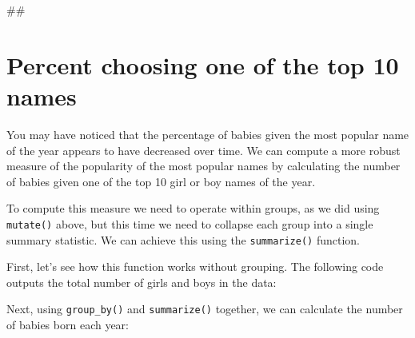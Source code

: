 \documentclass[]{book}
\newenvironment{Shaded}{\begin{snugshade}}{\end{snugshade}}
\newcommand{\KeywordTok}[1]{\textcolor[rgb]{0.13,0.29,0.53}{\textbf{#1}}}
\newcommand{\DataTypeTok}[1]{\textcolor[rgb]{0.13,0.29,0.53}{#1}}
\newcommand{\StringTok}[1]{\textcolor[rgb]{0.31,0.60,0.02}{#1}}
\newcommand{\OperatorTok}[1]{\textcolor[rgb]{0.81,0.36,0.00}{\textbf{#1}}}
\newcommand{\NormalTok}[1]{#1}
\begin{document}
\begin{Shaded}
\begin{Highlighting}[]
\NormalTok{##}
\end{Highlighting}
\end{Shaded}

\section{Percent choosing one of the top 10
names}\label{percent-choosing-one-of-the-top-10-names}

You may have noticed that the percentage of babies given the most
popular name of the year appears to have decreased over time. We can
compute a more robust measure of the popularity of the most popular
names by calculating the number of babies given one of the top 10 girl
or boy names of the year.

To compute this measure we need to operate within groups, as we did
using \texttt{mutate()} above, but this time we need to collapse each
group into a single summary statistic. We can achieve this using the
\texttt{summarize()} function.

First, let's see how this function works without grouping. The following
code outputs the total number of girls and boys in the data:

\begin{Shaded}
\end{Shaded}

Next, using \texttt{group\_by()} and \texttt{summarize()} together, we
can calculate the number of babies born each year:

\begin{Shaded}
\end{Shaded}
\end{document}

